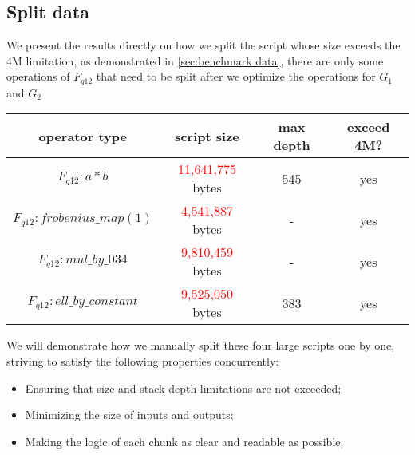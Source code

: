 \subsection{Split data} \label{sec:split-data}

We present the results directly on how we split the script whose size exceeds the 4M limitation, as demonstrated in \ref{sec:benchmark data},
there are only some operations of $F_{q12}$ that need to be split after we optimize the operations for $G_1$ and $G_2$

\begin{center}
\begin{tabular}{|c|c|c|c|} \hline
    operator type & script size & max depth & exceed 4M? \\ \hline
    $F_{q12}: a * b$ & \textcolor{red}{11,641,775} bytes & 545 & yes \\ \hline
    $F_{q12}: frobenius\_map(1)$ & \textcolor{red}{4,541,887} bytes & - & yes \\ \hline
    $F_{q12}: mul\_by\_034$ & \textcolor{red}{9,810,459} bytes & - & yes \\ \hline
    $F_{q12}: ell\_by\_constant$ & \textcolor{red}{9,525,050} bytes & 383 & yes \\ \hline    
\end{tabular}
\end{center}


We will demonstrate how we manually split these four large scripts one by one, striving to satisfy the following properties concurrently:

\begin{itemize}
    \item Ensuring that size and stack depth limitations are not exceeded;
    \item Minimizing the size of inputs and outputs;
    \item Making the logic of each chunk as clear and readable as possible; 
\end{itemize}



